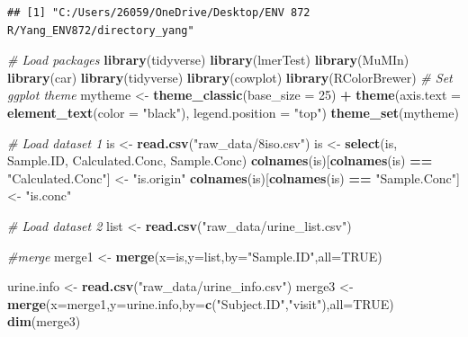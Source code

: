 \documentclass[12pt,]{article}
\newenvironment{Shaded}{\begin{snugshade}}{\end{snugshade}}
\newcommand{\CommentTok}[1]{\textcolor[rgb]{0.56,0.35,0.01}{\textit{#1}}}
\newcommand{\DataTypeTok}[1]{\textcolor[rgb]{0.13,0.29,0.53}{#1}}
\newcommand{\DecValTok}[1]{\textcolor[rgb]{0.00,0.00,0.81}{#1}}
\newcommand{\KeywordTok}[1]{\textcolor[rgb]{0.13,0.29,0.53}{\textbf{#1}}}
\newcommand{\NormalTok}[1]{#1}
\newcommand{\OperatorTok}[1]{\textcolor[rgb]{0.81,0.36,0.00}{\textbf{#1}}}
\newcommand{\OtherTok}[1]{\textcolor[rgb]{0.56,0.35,0.01}{#1}}
\newcommand{\StringTok}[1]{\textcolor[rgb]{0.31,0.60,0.02}{#1}}
\begin{document}
\begin{verbatim}
## [1] "C:/Users/26059/OneDrive/Desktop/ENV 872 R/Yang_ENV872/directory_yang"
\end{verbatim}

\begin{Shaded}
\begin{Highlighting}[]
\CommentTok{# Load packages}
\KeywordTok{library}\NormalTok{(tidyverse)}
\KeywordTok{library}\NormalTok{(lmerTest)}
\KeywordTok{library}\NormalTok{(MuMIn)}
\KeywordTok{library}\NormalTok{(car)}
\KeywordTok{library}\NormalTok{(tidyverse)}
\KeywordTok{library}\NormalTok{(cowplot)}
\KeywordTok{library}\NormalTok{(RColorBrewer)}
\CommentTok{# Set ggplot theme}
\NormalTok{mytheme <-}\StringTok{ }\KeywordTok{theme_classic}\NormalTok{(}\DataTypeTok{base_size =} \DecValTok{25}\NormalTok{) }\OperatorTok{+}
\StringTok{  }\KeywordTok{theme}\NormalTok{(}\DataTypeTok{axis.text =} \KeywordTok{element_text}\NormalTok{(}\DataTypeTok{color =} \StringTok{"black"}\NormalTok{), }
        \DataTypeTok{legend.position =} \StringTok{"top"}\NormalTok{)}
\KeywordTok{theme_set}\NormalTok{(mytheme)}

\CommentTok{# Load dataset 1}
\NormalTok{is <-}\StringTok{ }\KeywordTok{read.csv}\NormalTok{(}\StringTok{"raw_data/8iso.csv"}\NormalTok{)}
\NormalTok{is <-}\StringTok{ }\KeywordTok{select}\NormalTok{(is, Sample.ID, Calculated.Conc, Sample.Conc)}
\KeywordTok{colnames}\NormalTok{(is)[}\KeywordTok{colnames}\NormalTok{(is) }\OperatorTok{==}\StringTok{ "Calculated.Conc"}\NormalTok{] <-}\StringTok{ "is.origin"}
\KeywordTok{colnames}\NormalTok{(is)[}\KeywordTok{colnames}\NormalTok{(is) }\OperatorTok{==}\StringTok{ "Sample.Conc"}\NormalTok{] <-}\StringTok{ "is.conc"}

\CommentTok{# Load dataset 2}
\NormalTok{list <-}\StringTok{ }\KeywordTok{read.csv}\NormalTok{(}\StringTok{"raw_data/urine_list.csv"}\NormalTok{)}

\CommentTok{#merge}
\NormalTok{merge1 <-}\StringTok{ }\KeywordTok{merge}\NormalTok{(}\DataTypeTok{x=}\NormalTok{is,}\DataTypeTok{y=}\NormalTok{list,}\DataTypeTok{by=}\StringTok{"Sample.ID"}\NormalTok{,}\DataTypeTok{all=}\OtherTok{TRUE}\NormalTok{)}

\NormalTok{urine.info <-}\StringTok{ }\KeywordTok{read.csv}\NormalTok{(}\StringTok{"raw_data/urine_info.csv"}\NormalTok{)}
\NormalTok{merge3 <-}\StringTok{ }\KeywordTok{merge}\NormalTok{(}\DataTypeTok{x=}\NormalTok{merge1,}\DataTypeTok{y=}\NormalTok{urine.info,}\DataTypeTok{by=}\KeywordTok{c}\NormalTok{(}\StringTok{"Subject.ID"}\NormalTok{,}\StringTok{"visit"}\NormalTok{),}\DataTypeTok{all=}\OtherTok{TRUE}\NormalTok{)}
\KeywordTok{dim}\NormalTok{(merge3)}
\end{Highlighting}
\end{Shaded}
\end{document}
